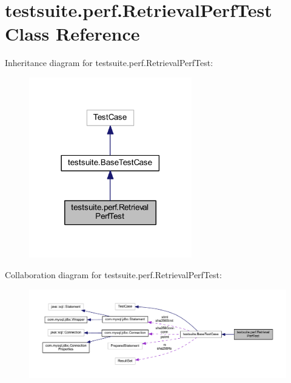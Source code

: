 \hypertarget{classtestsuite_1_1perf_1_1_retrieval_perf_test}{}\section{testsuite.\+perf.\+Retrieval\+Perf\+Test Class Reference}
\label{classtestsuite_1_1perf_1_1_retrieval_perf_test}


Inheritance diagram for testsuite.\+perf.\+Retrieval\+Perf\+Test\+:
\nopagebreak
\begin{figure}[H]
\begin{center}
\leavevmode
\includegraphics[width=201pt]{classtestsuite_1_1perf_1_1_retrieval_perf_test__inherit__graph}
\end{center}
\end{figure}


Collaboration diagram for testsuite.\+perf.\+Retrieval\+Perf\+Test\+:
\nopagebreak
\begin{figure}[H]
\begin{center}
\leavevmode
\includegraphics[width=350pt]{classtestsuite_1_1perf_1_1_retrieval_perf_test__coll__graph}
\end{center}
\end{figure}
